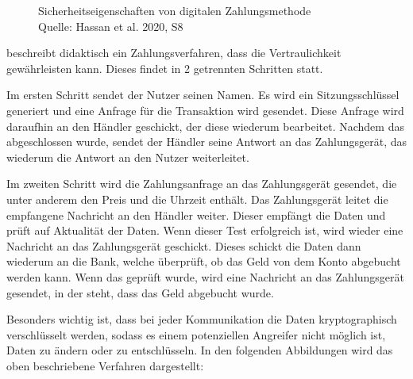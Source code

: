 \vfill
\begin{figure}[htb]
    \caption{Sicherheitseigenschaften von digitalen Zahlungsmethode \\ Quelle: Hassan et al. 2020, S8}
    \label{fig:refark_HARE}
\end{figure}
\vfill

\cite{refart:JTAS} beschreibt didaktisch ein Zahlungsverfahren, dass die Vertraulichkeit gewährleisten kann.
Dieses findet in 2 getrennten Schritten statt.

Im ersten Schritt sendet der Nutzer seinen Namen. Es wird ein Sitzungsschlüssel generiert und 
eine Anfrage für die Transaktion wird gesendet. Diese Anfrage wird daraufhin an den Händler geschickt, der 
diese wiederum bearbeitet. Nachdem das abgeschlossen wurde, sendet der Händler seine Antwort an das Zahlungsgerät, 
das wiederum die Antwort an den Nutzer weiterleitet. 

Im zweiten Schritt wird die Zahlungsanfrage an das Zahlungsgerät gesendet, die unter anderem den Preis und die 
Uhrzeit enthält. Das Zahlungsgerät leitet die empfangene Nachricht an den Händler weiter. Dieser empfängt die Daten 
und prüft auf Aktualität der Daten. Wenn dieser Test erfolgreich ist, wird wieder eine Nachricht an das Zahlungsgerät 
geschickt. Dieses schickt die Daten dann wiederum an die Bank, welche überprüft, ob das Geld von dem Konto 
abgebucht werden kann. Wenn das geprüft wurde, wird eine Nachricht an das Zahlungsgerät gesendet, in der steht, 
dass das Geld abgebucht wurde. 

Besonders wichtig ist, dass bei jeder Kommunikation die Daten kryptographisch verschlüsselt werden, sodass es einem 
potenziellen Angreifer nicht möglich ist, Daten zu ändern oder zu entschlüsseln. In den folgenden Abbildungen wird
das oben beschriebene Verfahren dargestellt:

